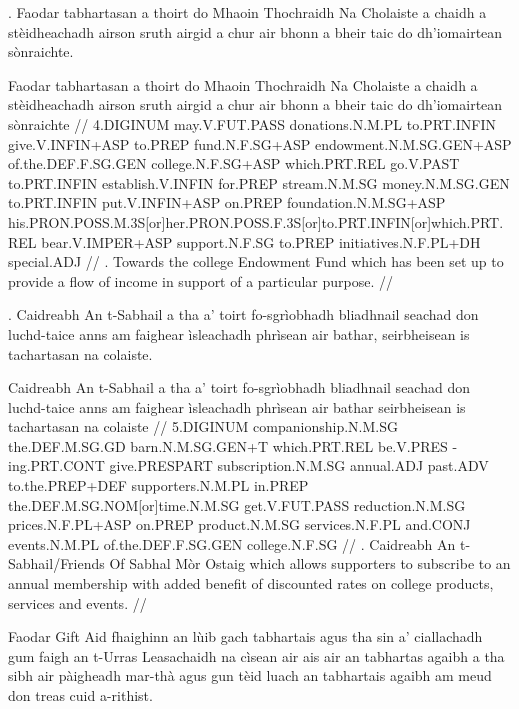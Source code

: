 \documentclass[a4paper,10pt]{article}
\begin{document}
\ex
\begingl
{}. Faodar tabhartasan a thoirt do Mhaoin Thochraidh Na Cholaiste a chaidh a stèidheachadh airson sruth airgid a chur air bhonn a bheir taic do dh'iomairtean sònraichte. 

\vspace{4mm}
 Faodar tabhartasan a thoirt do Mhaoin Thochraidh Na Cholaiste a chaidh a stèidheachadh airson sruth airgid a chur air bhonn a bheir taic do dh'iomairtean sònraichte  //
\glb 4.DIGINUM may.V.FUT.PASS donations.N.M.PL to.PRT.INFIN give.V.INFIN+ASP to.PREP fund.N.F.SG+ASP endowment.N.M.SG.GEN+ASP of.the.DEF.F.SG.GEN college.N.F.SG+ASP which.PRT.REL go.V.PAST to.PRT.INFIN establish.V.INFIN for.PREP stream.N.M.SG money.N.M.SG.GEN to.PRT.INFIN put.V.INFIN+ASP on.PREP foundation.N.M.SG+ASP his.PRON.POSS.M.3S[or]her.PRON.POSS.F.3S[or]to.PRT.INFIN[or]which.PRT.REL bear.V.IMPER+ASP support.N.F.SG to.PREP initiatives.N.F.PL+DH special.ADJ  //
. Towards the college Endowment Fund which has been set up to provide a flow of income in support of a particular purpose. //
\endgl
\xe

\ex
\begingl
{}. Caidreabh An t-Sabhail a tha a' toirt fo-sgrìobhadh bliadhnail seachad don luchd-taice anns am faighear ìsleachadh phrìsean air bathar, seirbheisean is tachartasan na colaiste. 

\vspace{4mm}
 Caidreabh An t-Sabhail a tha a' toirt fo-sgrìobhadh bliadhnail seachad don luchd-taice anns am faighear ìsleachadh phrìsean air bathar seirbheisean is tachartasan na colaiste  //
\glb 5.DIGINUM companionship.N.M.SG the.DEF.M.SG.GD barn.N.M.SG.GEN+T which.PRT.REL be.V.PRES -ing.PRT.CONT give.PRESPART subscription.N.M.SG annual.ADJ past.ADV to.the.PREP+DEF supporters.N.M.PL in.PREP the.DEF.M.SG.NOM[or]time.N.M.SG get.V.FUT.PASS reduction.N.M.SG prices.N.F.PL+ASP on.PREP product.N.M.SG services.N.F.PL and.CONJ events.N.M.PL of.the.DEF.F.SG.GEN college.N.F.SG  //
. Caidreabh An t-Sabhail/Friends Of Sabhal Mòr Ostaig which allows supporters to subscribe to an annual membership with added benefit of discounted rates on college products, services and events. //
\endgl
\xe

\ex
\begingl
\glpre Faodar Gift Aid fhaighinn an lùib gach tabhartais agus tha sin a' ciallachadh gum faigh an t-Urras Leasachaidh na cìsean air ais air an tabhartas agaibh a tha sibh air pàigheadh mar-thà agus gun tèid luach an tabhartais agaibh am meud don treas cuid a-rithist. 
\end{document}
